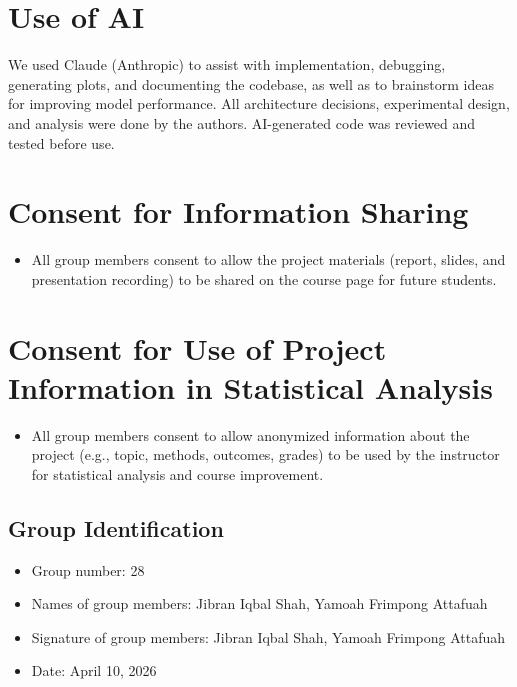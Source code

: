 \documentclass{article}
\begin{document}




\newpage
\section*{Use of AI}
We used Claude (Anthropic) to assist with implementation, debugging, generating plots, and documenting the codebase, as well as to brainstorm ideas for improving model performance. All architecture decisions, experimental design, and analysis were done by the authors. AI-generated code was reviewed and tested before use.


\section*{Consent for Information Sharing}

\begin{itemize}
	\item All group members consent to allow the project materials (report, slides, and presentation recording) to be shared on the course page for future students.
\end{itemize}


\section*{Consent for Use of Project Information in Statistical Analysis}
\begin{itemize}
	\item All group members consent to allow anonymized information about the project (e.g., topic, methods, outcomes, grades) to be used by the instructor for statistical analysis and course improvement.
\end{itemize}

\subsection*{Group Identification}

\begin{itemize}
	\item Group number: 28
	\item Names of group members: Jibran Iqbal Shah, Yamoah Frimpong Attafuah
	\item Signature of group members: Jibran Iqbal Shah, Yamoah Frimpong Attafuah
	\item Date: April 10, 2026
\end{itemize}
\end{document}
